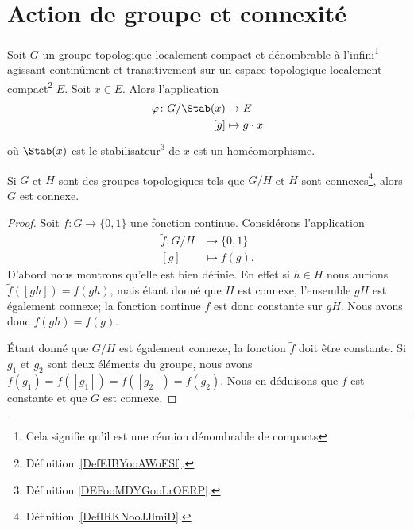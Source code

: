 
\section{Action de groupe et connexité}

\begin{theorem}     \label{ThojrLKZk}
	Soit \( G\) un groupe topologique localement compact et dénombrable à l'infini\footnote{Cela signifie qu'il est une réunion dénombrable de compacts} agissant continûment et transitivement sur un espace topologique localement compact\footnote{Définition~\ref{DefEIBYooAWoESf}.} \( E\). Soit \( x\in E\). Alors l'application
	\begin{equation}
		\begin{aligned}
			\varphi\colon G/\Stab(x) & \to E            \\
			[g]                      & \mapsto g\cdot x
		\end{aligned}
	\end{equation}
	où \( \Stab(x)\) est le stabilisateur\footnote{Définition \ref{DEFooMDYGooLrOERP}.} de \( x\) est un homéomorphisme.
\end{theorem}

\begin{lemma}       \label{LemkLRAet}
	Si \( G\) et \( H\) sont des groupes topologiques tels que \( G/H\) et \( H\) sont connexes\footnote{Définition~\ref{DefIRKNooJJlmiD}.}, alors \( G\) est connexe.
\end{lemma}

\begin{proof}
	Soit \( f\colon G\to \{ 0,1 \}\) une fonction continue. Considérons l'application
	\begin{equation}
		\begin{aligned}
			\tilde f\colon G/H & \to \{ 0,1 \} \\
			[g]                & \mapsto f(g).
		\end{aligned}
	\end{equation}
	D'abord nous montrons qu'elle est bien définie. En effet si \( h\in H\) nous aurions \( \tilde f([gh])=f(gh)\), mais étant donné que \( H\) est connexe, l'ensemble \( gH\) est également connexe; la fonction continue \( f\) est donc constante sur \( gH\). Nous avons donc \( f(gh)=f(g)\).

	Étant donné que \( G/H\) est également connexe, la fonction \( \tilde f\) doit être constante. Si \( g_1\) et \( g_2\) sont deux éléments du groupe, nous avons \( f(g_1)=\tilde f([g_1])=\tilde f([g_2])=f(g_2)\). Nous en déduisons que \( f\) est constante et que \( G\) est connexe.
\end{proof}

